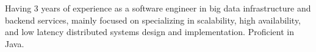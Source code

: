 
Having 3 years of experience as a software engineer in big data infrastructure and backend services, mainly focused on specializing in scalability, high availability, and low latency distributed systems design and implementation. Proficient in Java.  \\